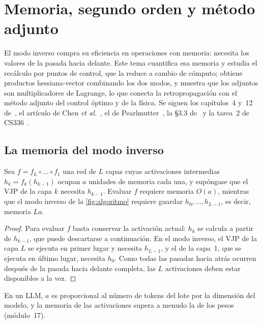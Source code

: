 \chapter{Memoria, segundo orden y método adjunto}
\label{tema:5}

El modo inverso compra su eficiencia en operaciones con memoria: necesita los valores de la pasada hacia delante. Este tema cuantifica esa memoria y estudia el recálculo por puntos de control, que la reduce a cambio de cómputo; obtiene productos hessiana-vector combinando los dos modos, y muestra que los adjuntos son multiplicadores de Lagrange, lo que conecta la retropropagación con el método adjunto del control óptimo y de la física. Se siguen los capítulos~4 y~12 de~\cite{gw}, el artículo de Chen \emph{et al.}~\cite{chen}, el de Pearlmutter~\cite{pearlmutter}, la §3.3 de~\cite{baydin} y la tarea~2 de CS336~\cite{cs336a2}.

\section{La memoria del modo inverso}

\begin{proposicion}\label{prop:memoria}
Sea $f=f_L\circ\dots\circ f_1$ una red de $L$ capas cuyas activaciones intermedias $h_k=f_k(h_{k-1})$ ocupan $a$ unidades de memoria cada una, y supóngase que el VJP de la capa $k$ necesita $h_{k-1}$. Evaluar $f$ requiere memoria $O(a)$, mientras que el modo inverso de la \cref{fig:algoritmo} requiere guardar $h_0,\dots,h_{L-1}$, es decir, memoria $La$.
\end{proposicion}

\begin{proof}
Para evaluar $f$ basta conservar la activación actual: $h_k$ se calcula a partir de $h_{k-1}$, que puede descartarse a continuación. En el modo inverso, el VJP de la capa $L$ se ejecuta en primer lugar y necesita $h_{L-1}$, y el de la capa~1, que se ejecuta en último lugar, necesita $h_0$. Como todas las pasadas hacia atrás ocurren después de la pasada hacia delante completa, las $L$ activaciones deben estar disponibles a la vez.
\end{proof}

En un LLM, $a$ es proporcional al número de tokens del lote por la dimensión del modelo, y la memoria de las activaciones supera a menudo la de los pesos (módulo~17).

